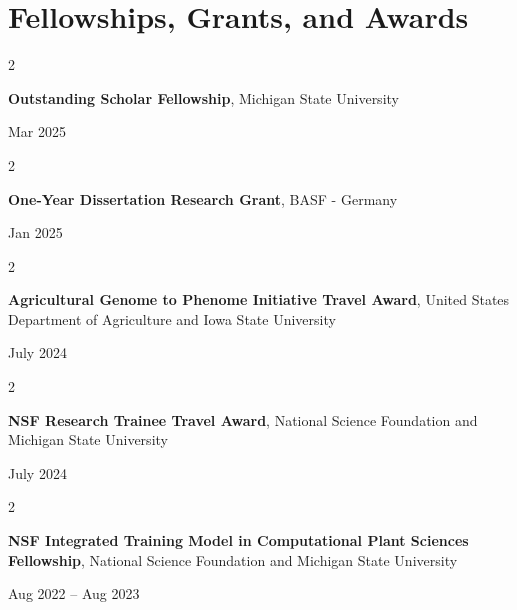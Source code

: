 \documentclass[10pt, letterpaper]{article}
\newenvironment{twocolentry}[2][]{
    \onecolentry
    \def\secondColumn{#2}
    \setcolumnwidth{\fill, 4.5 cm}
    \begin{paracol}{2}
}{
    \switchcolumn \raggedleft \secondColumn
    \end{paracol}
    \endonecolentry
} %
\begin{document}
    \section{Fellowships, Grants, and Awards}




        \begin{samepage} 
            \begin{twocolentry}{
                Mar 2025
                }
                \textbf{Outstanding Scholar Fellowship}, Michigan State University
            \end{twocolentry}
        \end{samepage}  


        \vspace{0.2 cm}

        
        \begin{samepage} 
            \begin{twocolentry}{
                Jan 2025
                }
                \textbf{One-Year Dissertation Research Grant}, BASF - Germany
            \end{twocolentry}
        \end{samepage}  


        \vspace{0.2 cm}

        
        \begin{samepage} 
            \begin{twocolentry}{
                July 2024
                }
                \textbf{Agricultural Genome to Phenome Initiative Travel Award}, United States Department of Agriculture and Iowa State University
            \end{twocolentry}
        \end{samepage}  


        \vspace{0.2 cm}


        \begin{samepage} 
            \begin{twocolentry}{
                July 2024
                }
                \textbf{NSF Research Trainee Travel Award}, National Science Foundation and Michigan State University
            \end{twocolentry}
        \end{samepage}  


        \vspace{0.2 cm}


        \begin{samepage} 
            \begin{twocolentry}{
                Aug 2022 – Aug 2023
                }
                \textbf{NSF Integrated Training Model in Computational Plant Sciences Fellowship}, National Science Foundation and Michigan State University
            \end{twocolentry}
        \end{samepage}  
\end{document}
